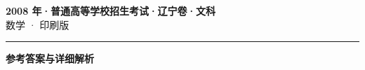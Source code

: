 \documentclass[zihao=5, a4paper]{ctexart}
\begin{document}
\begin{center}
  {\Large\bfseries 2008 年·普通高等学校招生考试·辽宁卷·文科}\\[4pt]
  {\large 数学 · 印刷版}
\end{center}
\medskip
{}

\par\bigskip\hrule\bigskip
{}
\begin{center}{\large\bfseries 参考答案与详细解析}\end{center}
\smallskip

\end{document}
